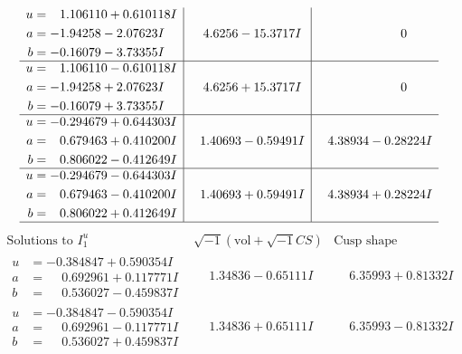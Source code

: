 \documentclass[1p]{elsarticle_modified}
\theoremstyle{definition}
\newcommand{\I}{\sqrt{-1}}
\begin{document}
$$\begin{array}{c|c|c}
\begin{aligned}
u &= \phantom{-}1.106110 + 0.610118 I \\
a &= -1.94258 - 2.07623 I \\
b &= -0.16079 - 3.73355 I\end{aligned}
 & \phantom{-}4.6256 - 15.3717 I & \phantom{-0.000000 } 0 \\ \hline\begin{aligned}
u &= \phantom{-}1.106110 - 0.610118 I \\
a &= -1.94258 + 2.07623 I \\
b &= -0.16079 + 3.73355 I\end{aligned}
 & \phantom{-}4.6256 + 15.3717 I & \phantom{-0.000000 } 0 \\ \hline\begin{aligned}
u &= -0.294679 + 0.644303 I \\
a &= \phantom{-}0.679463 + 0.410200 I \\
b &= \phantom{-}0.806022 - 0.412649 I\end{aligned}
 & \phantom{-}1.40693 - 0.59491 I & \phantom{-}4.38934 - 0.28224 I \\ \hline\begin{aligned}
u &= -0.294679 - 0.644303 I \\
a &= \phantom{-}0.679463 - 0.410200 I \\
b &= \phantom{-}0.806022 + 0.412649 I\end{aligned}
 & \phantom{-}1.40693 + 0.59491 I & \phantom{-}4.38934 + 0.28224 I\\
 \hline 
 \end{array}$$\newpage$$\begin{array}{c|c|c}  
\text{Solutions to }I^u_{1}& \I (\text{vol} + \sqrt{-1}CS) & \text{Cusp shape}\\
 \hline 
\begin{aligned}
u &= -0.384847 + 0.590354 I \\
a &= \phantom{-}0.692961 + 0.117771 I \\
b &= \phantom{-}0.536027 - 0.459837 I\end{aligned}
 & \phantom{-}1.34836 - 0.65111 I & \phantom{-}6.35993 + 0.81332 I \\ \hline\begin{aligned}
u &= -0.384847 - 0.590354 I \\
a &= \phantom{-}0.692961 - 0.117771 I \\
b &= \phantom{-}0.536027 + 0.459837 I\end{aligned}
 & \phantom{-}1.34836 + 0.65111 I & \phantom{-}6.35993 - 0.81332 I \\ \hline\begin{aligned}

\end{aligned}
\end{array}$$
\end{document}
